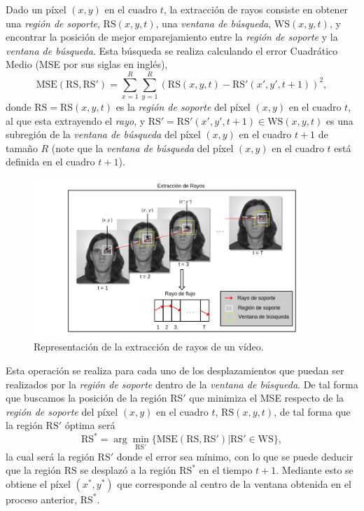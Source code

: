 	Dado un píxel $(x,y)$ en el cuadro $t$, la extracción de rayos consiste en obtener una \textit{región de soporte}, $\text{RS}(x,y,t)$, una \textit{ventana de búsqueda}, $\text{WS}(x,y,t)$, y encontrar la posición de mejor emparejamiento entre la \textit{región de soporte} y la \textit{ventana de búsqueda}. Esta búsqueda se realiza calculando el error Cuadrático Medio (MSE por sus siglas en inglés), \begin{equation}\label{algoritmo:eq:mse}	
			\text{MSE}(\text{RS}, \text{RS}') = \sum_{x=1}^{R} \sum_{y=1}^{R} \left(\text{RS}(x,y,t) - \text{RS}'(x',y', t+1)\right)^2,
		\end{equation} 
	donde $\text{RS} = \text{RS}(x,y,t)$ es la \textit{región de soporte} del píxel $(x,y)$ en el cuadro $t$, al que esta extrayendo el \textit{rayo}, y $\text{RS}' = \text{RS}'(x',y',t+1) \in \text{WS}(x,y,t)$ es una subregión de la \textit{ventana de búsqueda} del píxel $(x,y)$ en el cuadro $t+1$ de tamaño $R$ (note que la \textit{ventana de búsqueda} del píxel $(x,y)$ en el cuadro $t$ está definida en el cuadro $t+1$).
		
			\begin{figure}[bt]
				\centering
				\includegraphics[width=0.9\textwidth]{Figuras/Diagramas/Extraccion_de_rayos.png}
				\caption{Representación de la extracción de rayos de un vídeo.}
				\label{algoritmo:fig:extraccion}
			\end{figure}
	Esta operación se realiza para cada uno de los desplazamientos que puedan ser realizados por la \textit{región de soporte} dentro de la \textit{ventana de búsqueda}. De tal forma que buscamos la posición de la región $\text{RS}'$ que minimiza el MSE respecto de la \textit{región de soporte} del píxel $(x,y)$ en el cuadro $t$, $\text{RS}(x,y,t)$, de tal forma que la región $\text{RS}'$ óptima será
	\begin{equation}
		\text{RS}^* = \arg \min_{\text{RS}'}\{\text{MSE}(\text{RS},\text{RS}') | \text{RS}' \in \text{WS} \},
	\end{equation}		
	 la cual será la región $\text{RS}'$ donde el error sea mínimo, con lo que se puede deducir que la región $\text{RS}$ se desplazó a la región $\text{RS}^*$ en el tiempo $t+1$. Mediante esto se obtiene el píxel $(x^*,y^*)$ que corresponde al centro de la ventana obtenida en el proceso anterior, $\text{RS}^*$.
	
